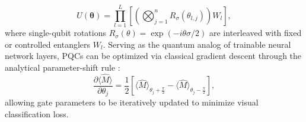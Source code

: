 \documentclass[pdflatex,sn-mathphys-num]{sn-jnl}%
\theoremstyle{thmstyleone}%
\theoremstyle{thmstyletwo}%
\theoremstyle{thmstylethree}%
\begin{document}
\begin{equation}
U(\boldsymbol{\theta}) = \prod_{l=1}^L \left[ \left(\bigotimes_{j=1}^n R_{\sigma}(\theta_{l,j})\right) W_l \right],
\label{eq:pqc_general_form}
\end{equation}
where single-qubit rotations $R_{\sigma}(\theta) = \exp(-i\theta\sigma/2)$ are interleaved with fixed or controlled entanglers $W_l$. Serving as the quantum analog of trainable neural network layers, PQCs can be optimized via classical gradient descent through the analytical parameter-shift rule \cite{schuld2019evaluating}:
\begin{equation}
\frac{\partial \langle \hat{M} \rangle}{\partial \theta_j} = \frac{1}{2} \left[ \langle \hat{M} \rangle_{\theta_j + \frac{\pi}{2}} - \langle \hat{M} \rangle_{\theta_j - \frac{\pi}{2}} \right],
\label{eq:parameter_shift_intro}
\end{equation}
allowing gate parameters to be iteratively updated to minimize visual classification loss.
\end{document}
